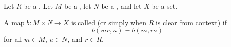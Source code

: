 \begin{definition} \label{definition:r_balanced_map_between_right_and_left_modules}
    Let $R$ be a . Let $M$ be a , let $N$ be a , and let $X$ be a set.

    A map $b: M \times N \to X$ is called  (or simply  when $R$ is clear from context) if
    $$b(mr, n) = b(m, rn)$$
    for all $m \in M$, $n \in N$, and $r \in R$.
\end{definition}
